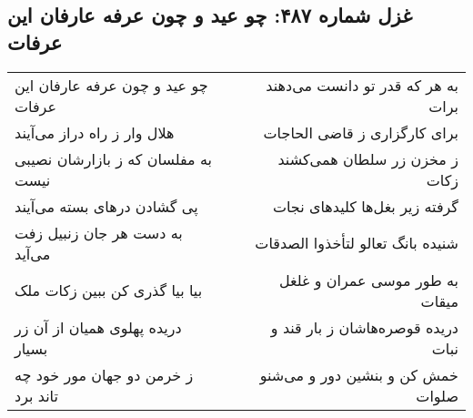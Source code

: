 \begin{center}
\section*{غزل شماره ۴۸۷: چو عید و چون عرفه عارفان این عرفات}
\label{sec:0487}
\begin{longtable}{l p{0.5cm} r}
چو عید و چون عرفه عارفان این عرفات
&&
به هر که قدر تو دانست می‌دهند برات
\\
هلال وار ز راه دراز می‌آیند
&&
برای کارگزاری ز قاضی الحاجات
\\
به مفلسان که ز بازارشان نصیبی نیست
&&
ز مخزن زر سلطان همی‌کشند زکات
\\
پی گشادن درهای بسته می‌آیند
&&
گرفته زیر بغل‌ها کلیدهای نجات
\\
به دست هر جان زنبیل زفت می‌آید
&&
شنیده بانگ تعالو لتأخذوا الصدقات
\\
بیا بیا گذری کن ببین زکات ملک
&&
به طور موسی عمران و غلغل میقات
\\
دریده پهلوی همیان از آن زر بسیار
&&
دریده قوصره‌هاشان ز بار قند و نبات
\\
ز خرمن دو جهان مور خود چه تاند برد
&&
خمش کن و بنشین دور و می‌شنو صلوات
\\
\end{longtable}
\end{center}
